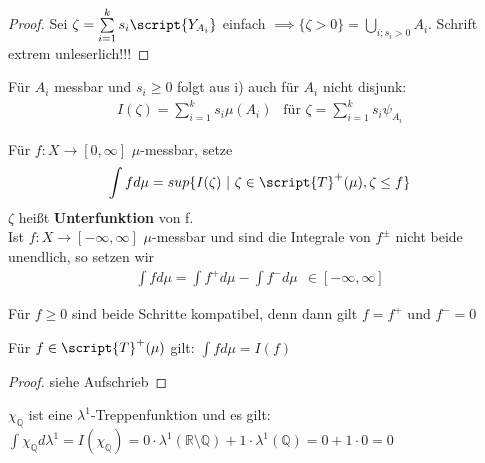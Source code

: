   \begin{proof}
    Sei $\zeta = \sum\limits_{i=1}^{k} s_i \script{Y_{A_i}}$ einfach $\implies \{\zeta > 0\} = \bigcup\limits_{i;s_i >0} A_i$.\newline
    Schrift extrem unleserlich!!!
  \end{proof}

  \begin{remark}
    Für $A_i$ messbar und $s_i \geq 0$ folgt aus i) auch für $A_i$ nicht disjunk:
    \begin{align*}
      I(\zeta) = \sum\limits_{i=1}^k s_i \mu(A_i) \ \ \text{ für } \zeta = \sum\limits_{i=1}^k s_i \psi_{A_i}
    \end{align*}
  \end{remark}

  \begin{definition}
    Für $f: X \to [0,\infty]$ $\mu$-messbar, setze
    \begin{align*}
      \int f d\mu = sup\{I(\zeta) \ | \ \zeta \in \script{T}^+(\mu), \zeta \leq f\}
    \end{align*}
    $\zeta$ heißt \textbf{Unterfunktion} von f.\\
    Ist $f: X \to [-\infty, \infty]$ $\mu$-messbar und sind die Integrale von $f^{\pm}$ nicht beide unendlich, so setzen wir
    \begin{align*}
      \int f d\mu = \int f^+ d\mu - \int f^- d\mu \ \ \in [-\infty, \infty] 
    \end{align*}
  \end{definition}

  \begin{remark}
    Für $f \geq 0$ sind beide Schritte kompatibel, denn dann gilt $f = f^+$ und $f^- = 0$
  \end{remark}

  \begin{lemma}
    Für $f \in \script{T}^+(\mu)$ gilt: $\int f d\mu = I(f)$
  \end{lemma}

  \begin{proof}
    siehe Aufschrieb
  \end{proof}

  \begin{example}
    $\chi_{\mathbb{Q}}$ ist eine $\lambda^1$-Treppenfunktion und es gilt:\\
    $\int \chi_{\mathbb{Q}} d\lambda^1 = I(\chi_{\mathbb{Q}}) = 0 \cdot \lambda^1(\mathbb{R} \setminus \mathbb{Q}) + 1 \cdot \lambda^1(\mathbb{Q}) = 0 + 1 \cdot 0 = 0$
  \end{example}

